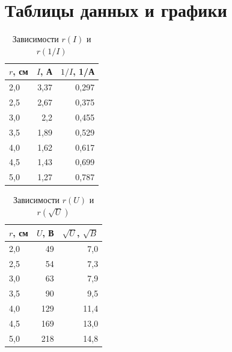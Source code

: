 \documentclass[12pt]{article}
\begin{document}
	\section{Таблицы данных и графики}
	\begin{table}[H]
		\centering
		\begin{tabular}{|l|r|r|}
			\hline
			$r$, см & \multicolumn{1}{l|}{$I$, А} & \multicolumn{1}{l|}{$1/I$, 1/А} \\ \hline
			2,0     & 3,37                        & 0,297                           \\ \hline
			2,5     & 2,67                        & 0,375                           \\ \hline
			3,0     & 2,2                         & 0,455                           \\ \hline
			3,5     & 1,89                        & 0,529                           \\ \hline
			4,0     & 1,62                        & 0,617                           \\ \hline
			4,5     & 1,43                        & 0,699                           \\ \hline
			5,0     & 1,27                        & 0,787                           \\ \hline
		\end{tabular}
		\caption{Зависимости $r(I)$ и $r(1/I)$}
	\end{table}
	\begin{table}[H]
		\centering
		\begin{tabular}{|l|r|r|}
			\hline
			$r$, см & \multicolumn{1}{l|}{$U$, В} & \multicolumn{1}{l|}{$\sqrt{U}$, $\sqrt{B}$} \\ \hline
			2,0     & 49                          & 7,0                                         \\ \hline
			2,5     & 54                          & 7,3                                         \\ \hline
			3,0     & 63                          & 7,9                                         \\ \hline
			3,5     & 90                          & 9,5                                         \\ \hline
			4,0     & 129                         & 11,4                                        \\ \hline
			4,5     & 169                         & 13,0                                        \\ \hline
			5,0     & 218                         & 14,8                                        \\ \hline
		\end{tabular}
		\caption{Зависимости $r(U)$ и $r(\sqrt{U})$}
	\end{table}
\end{document}
